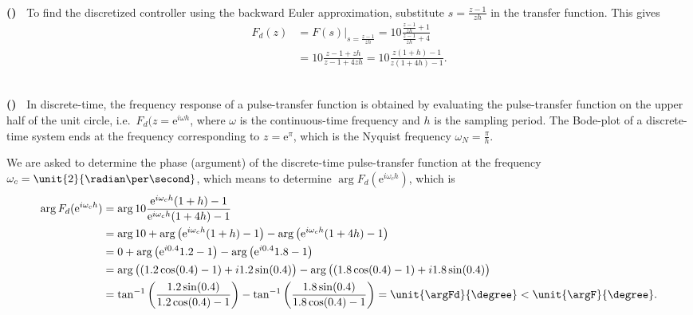 \documentclass[letterpaper,12pt]{scrartcl}
\newenvironment{exercise}[1][Problem]{\begin{trivlist} \item[\hskip
    \labelsep {\stepcounter{exerctr}\bfseries #1
      \arabic{exerctr}}]}{\end{trivlist}\vspace{10mm}}
\newcounter{exerctr}
\newcounter{abcctr}[exerctr]
\newcommand{\abc}{\noindent\vspace{1mm}\\ {\bf
    \stepcounter{abcctr}(\alph{abcctr})\ }}
\begin{document}
\begin{exercise}
\abc%
To find the discretized controller using the backward Euler approximation, substitute $s = \frac{z-1}{zh}$ in the transfer function. This gives
\begin{equation*}
\begin{aligned}
  F_d(z) &= F(s)|_{s=\frac{z-1}{zh}} = 10 \frac{\frac{z-1}{zh} + 1}{\frac{z-1}{zh} + 4}\\
         &= 10 \frac{z-1 + zh}{z-1 + 4zh} = 10\frac{z(1+h) - 1}{z(1+4h) - 1}.
\end{aligned}
\end{equation*}

\abc%
In discrete-time, the frequency response of a pulse-transfer function is obtained by evaluating the pulse-transfer function on the upper half of the unit circle, i.e.~\(F_d(z=\mathrm{e}^{i\omega h}\), where $\omega$ is the continuous-time frequency and $h$ is the sampling period. The Bode-plot of a discrete-time system ends at the frequency corresponding to $z=\mathrm{e}^\pi$, which is the Nyquist frequency $\omega_N = \frac{\pi}{h}$. 

We are asked to determine the phase (argument) of the discrete-time pulse-transfer function at the frequency $\omega_c = \unit{2}{\radian\per\second}$, which means to determine $\arg F_d(\mathrm{e}^{i\omega_c h})$, which is
\pgfmathsetmacro{}
\pgfmathsetmacro{}
\pgfmathsetmacro{}
\pgfmathsetmacro{} 
\begin{equation*}
  \begin{aligned}
    \arg F_d(\mathrm{e}^{i\omega_c h}) &= \arg 10 \frac{\mathrm{e}^{i\omega_c h}(1+h) - 1}{\mathrm{e}^{i\omega_c h}(1+4h) - 1}\\
 &= \arg 10 + \arg \big(\mathrm{e}^{i\omega_c h}(1+h) - 1\big) - \arg \big(\mathrm{e}^{i\omega_c h}(1+4h) - 1\big)\\
      &= 0 + \arg \big(\mathrm{e}^{i0.4}1.2 - 1\big) - \arg \big(\mathrm{e}^{i0.4}1.8 - 1\big)\\
       &= \arg\big( (1.2\cos(0.4)-1) + i1.2\sin(0.4) \big) - \arg\big( (1.8\cos(0.4)-1) + i1.8\sin(0.4)\big)\\
      &= \tan^{-1}\left(\frac{1.2\sin(0.4)}{1.2\cos(0.4)-1}\right) - \tan^{-1}\left(\frac{1.8\sin(0.4)}{1.8\cos(0.4)-1}\right) = \unit{\argFd}{\degree} < \unit{\argF}{\degree}.
  \end{aligned}
\end{equation*} 
\end{exercise}
\end{document}
